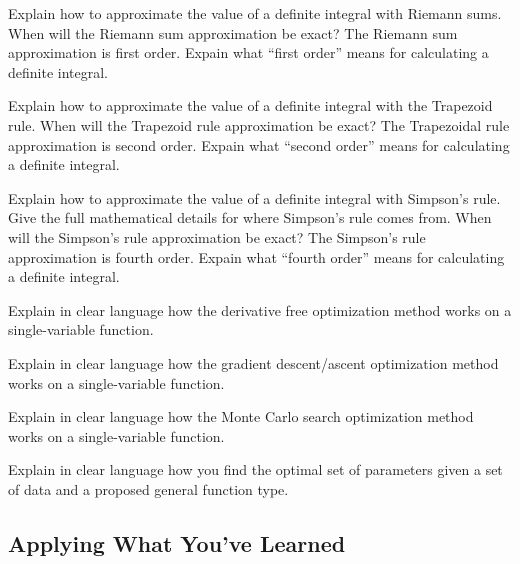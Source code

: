 \begin{problem}
    Explain how to approximate the value of a definite integral with Riemann sums.  When
    will the Riemann sum approximation be exact?  The Riemann sum approximation is first
    order.  Expain what ``first order'' means for calculating a definite integral. 
\end{problem}

\begin{problem}
    Explain how to approximate the value of a definite integral with the Trapezoid rule.
    When will the Trapezoid rule approximation be exact?  The Trapezoidal rule
    approximation is second
    order.  Expain what ``second order'' means for calculating a definite integral. 
\end{problem}

\begin{problem}
    Explain how to approximate the value of a definite integral with Simpson's rule.  Give
    the full mathematical details for where Simpson's rule comes from.  When will the
    Simpson's rule approximation be exact?  The Simpson's rule approximation is fourth
    order.  Expain what ``fourth order'' means for calculating a definite integral. 
\end{problem}

\begin{problem}
    Explain in clear language how the derivative free optimization method works on a
    single-variable function.
\end{problem}

\begin{problem}
    Explain in clear language how the gradient descent/ascent optimization method works on a
    single-variable function.
\end{problem}

\begin{problem}
    Explain in clear language how the Monte Carlo search optimization method works on a
    single-variable function.
\end{problem}

\begin{problem}
    Explain in clear language how you find the optimal set of parameters given a set of
    data and a proposed general function type.
\end{problem}

\subsection{Applying What You've Learned}

